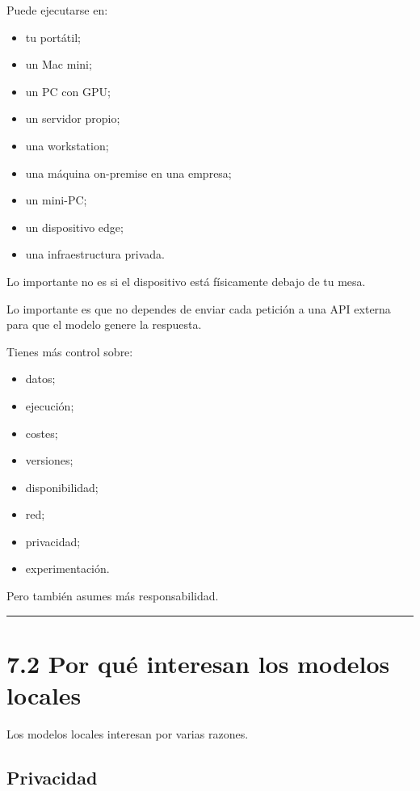 Puede ejecutarse en:

\begin{itemize}
\tightlist
\item
  tu portátil;
\item
  un Mac mini;
\item
  un PC con GPU;
\item
  un servidor propio;
\item
  una workstation;
\item
  una máquina on-premise en una empresa;
\item
  un mini-PC;
\item
  un dispositivo edge;
\item
  una infraestructura privada.
\end{itemize}

Lo importante no es si el dispositivo está físicamente debajo de tu
mesa.

Lo importante es que no dependes de enviar cada petición a una API
externa para que el modelo genere la respuesta.

Tienes más control sobre:

\begin{itemize}
\tightlist
\item
  datos;
\item
  ejecución;
\item
  costes;
\item
  versiones;
\item
  disponibilidad;
\item
  red;
\item
  privacidad;
\item
  experimentación.
\end{itemize}

Pero también asumes más responsabilidad.

\begin{center}\rule{0.5\linewidth}{0.5pt}\end{center}

\section{7.2 Por qué interesan los modelos
locales}\label{por-quuxe9-interesan-los-modelos-locales}

Los modelos locales interesan por varias razones.

\subsection{Privacidad}\label{privacidad-4}

